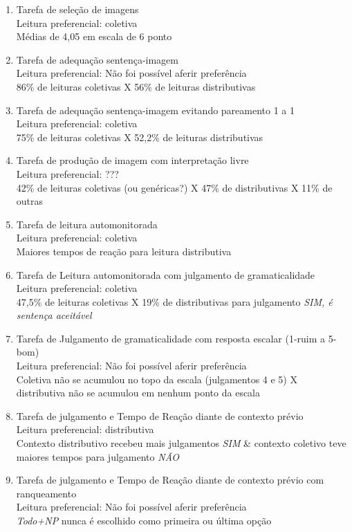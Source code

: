 \begin{enumerate}
    \item Tarefa de seleção de imagens \\
    Leitura preferencial: coletiva \\
    Médias de 4,05 em escala de 6 ponto
    \item Tarefa de adequação sentença-imagem \\
    Leitura preferencial: Não foi possível aferir preferência \\
    86\% de leituras coletivas X 56\% de leituras distributivas
    \item Tarefa de adequação sentença-imagem evitando pareamento 1 a 1 \\
    Leitura preferencial: coletiva \\
    75\%  de leituras coletivas X 52,2\%  de leituras distributivas
    \item Tarefa de produção de imagem com interpretação livre \\
    Leitura preferencial: ??? \\
    42\% de leituras coletivas (ou genéricas?) X 47\% de distributivas X 11\% de outras
    \item  Tarefa de leitura automonitorada \\
    Leitura preferencial: coletiva \\
    Maiores tempos de reação para leitura distributiva
    \item Tarefa de Leitura automonitorada com julgamento de gramaticalidade \\
    Leitura preferencial: coletiva \\
    47,5\% de leituras coletivas X 19\% de distributivas para julgamento \emph{SIM, é sentença aceitável}
    \item Tarefa de Julgamento de gramaticalidade com resposta escalar (1-ruim a 5-bom) \\
    Leitura preferencial: Não foi possível aferir preferência \\
    Coletiva não se acumulou no topo da escala (julgamentos 4 e 5) X distributiva não se acumulou em nenhum ponto da escala
    \item Tarefa de julgamento e Tempo de Reação diante de contexto prévio \\
    Leitura preferencial: distributiva \\
    Contexto distributivo recebeu mais julgamentos \emph{SIM} \& contexto coletivo teve maiores tempos para julgamento \emph{NÃO}
    \item Tarefa de julgamento e Tempo de Reação diante de contexto prévio com ranqueamento \\
    Leitura preferencial: Não foi possível aferir preferência \\
    \emph{Todo+NP} nunca é escolhido como primeira ou última opção
\end{enumerate}

